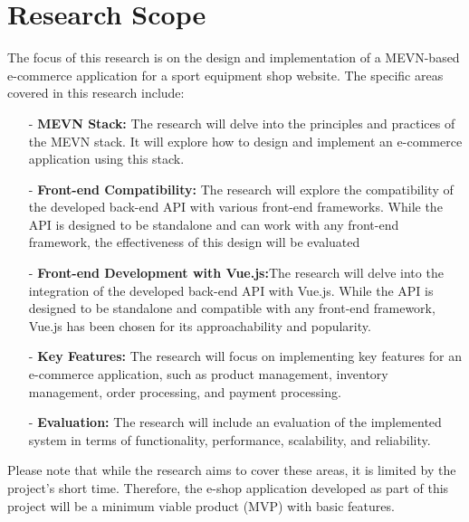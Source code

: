 \section{Research Scope}
The focus of this research is on the design and implementation of a MEVN-based e-commerce application for a sport equipment shop website.
The specific areas covered in this research include:
\begin{itemize}
    \item[-] \textbf{MEVN Stack:} The research will delve into the principles and practices of the MEVN stack. It will explore how to design and implement an e-commerce application using this stack.
    \item[-] \textbf{ Front-end Compatibility: } The research will explore the compatibility of the developed back-end API with various front-end frameworks. While the API is designed to be standalone and can work with any front-end framework, the effectiveness of this design will be evaluated
    \item[-] \textbf{Front-end Development with Vue.js:}The research will delve into the integration of the developed back-end API with Vue.js. While the API is designed to be standalone and compatible with any front-end framework, Vue.js has been chosen for its approachability and popularity.
    \item[-] \textbf{Key Features: } The research will focus on implementing key features for an e-commerce application, such as product management, inventory management, order processing, and payment processing.
    \item[-] \textbf{Evaluation:} The research will include an evaluation of the implemented system in terms of functionality, performance, scalability, and reliability.
\end{itemize}

Please note that while the research aims to cover these areas, it is limited by the project's short time. Therefore, the e-shop application developed as part of this project will be a minimum viable product (MVP) with basic features.
